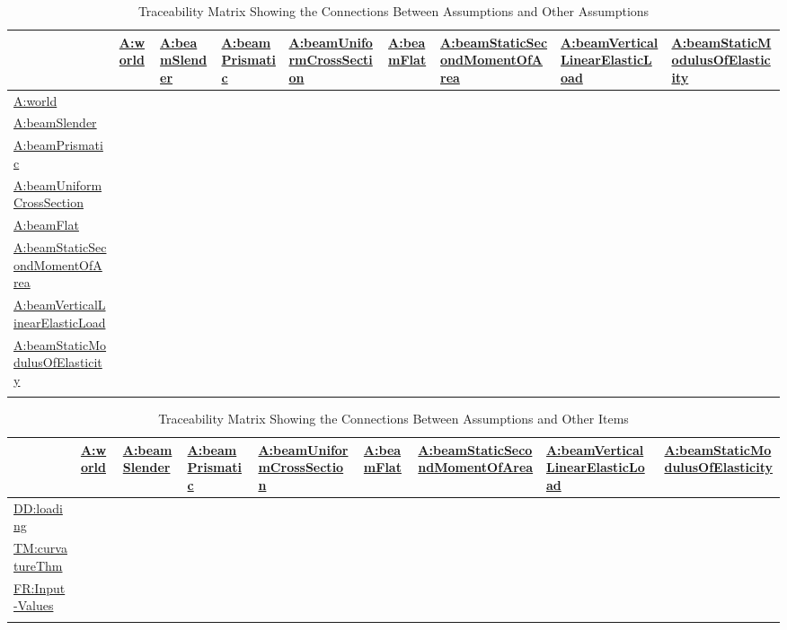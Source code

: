 \documentclass[12pt]{article}
\begin{document}
\begin{longtable}{l l l l l l l l l}
\toprule
\textbf{} & \textbf{\hyperref[world]{A:world}} & \textbf{\hyperref[beamSlender]{A:beamSlender}} & \textbf{\hyperref[beamPrismatic]{A:beamPrismatic}} & \textbf{\hyperref[beamUniformCrossSection]{A:beamUniformCrossSection}} & \textbf{\hyperref[beamFlat]{A:beamFlat}} & \textbf{\hyperref[beamStaticSecondMomentOfArea]{A:beamStaticSecondMomentOfArea}} & \textbf{\hyperref[beamVerticalLinearElasticLoad]{A:beamVerticalLinearElasticLoad}} & \textbf{\hyperref[beamStaticModulusOfElasticity]{A:beamStaticModulusOfElasticity}}
\\
\midrule
\endhead
\hyperref[world]{A:world} &  &  &  &  &  &  &  & 
\\
\hyperref[beamSlender]{A:beamSlender} &  &  &  &  &  &  &  & 
\\
\hyperref[beamPrismatic]{A:beamPrismatic} &  &  &  &  &  &  &  & 
\\
\hyperref[beamUniformCrossSection]{A:beamUniformCrossSection} &  &  &  &  &  &  &  & 
\\
\hyperref[beamFlat]{A:beamFlat} &  &  &  &  &  &  &  & 
\\
\hyperref[beamStaticSecondMomentOfArea]{A:beamStaticSecondMomentOfArea} &  &  &  &  &  &  &  & 
\\
\hyperref[beamVerticalLinearElasticLoad]{A:beamVerticalLinearElasticLoad} &  &  &  &  &  &  &  & 
\\
\hyperref[beamStaticModulusOfElasticity]{A:beamStaticModulusOfElasticity} &  &  &  &  &  &  &  & 
\\
\bottomrule
\caption{Traceability Matrix Showing the Connections Between Assumptions and Other Assumptions}
\label{Table:TraceMatAvsA}
\end{longtable}
\begin{longtable}{l l l l l l l l l}
\toprule
\textbf{} & \textbf{\hyperref[world]{A:world}} & \textbf{\hyperref[beamSlender]{A:beamSlender}} & \textbf{\hyperref[beamPrismatic]{A:beamPrismatic}} & \textbf{\hyperref[beamUniformCrossSection]{A:beamUniformCrossSection}} & \textbf{\hyperref[beamFlat]{A:beamFlat}} & \textbf{\hyperref[beamStaticSecondMomentOfArea]{A:beamStaticSecondMomentOfArea}} & \textbf{\hyperref[beamVerticalLinearElasticLoad]{A:beamVerticalLinearElasticLoad}} & \textbf{\hyperref[beamStaticModulusOfElasticity]{A:beamStaticModulusOfElasticity}}
\\
\midrule
\endhead
\hyperref[DD:loading]{DD:loading} &  &  &  &  &  &  &  & 
\\
\hyperref[TM:curvatureThm]{TM:curvatureThm} &  &  &  &  &  &  &  & 
\\
\hyperref[inputValues]{FR:Input-Values} &  &  &  &  &  &  &  & 
\\
\bottomrule
\caption{Traceability Matrix Showing the Connections Between Assumptions and Other Items}
\label{Table:TraceMatAvsAll}
\end{longtable}
\end{document}
